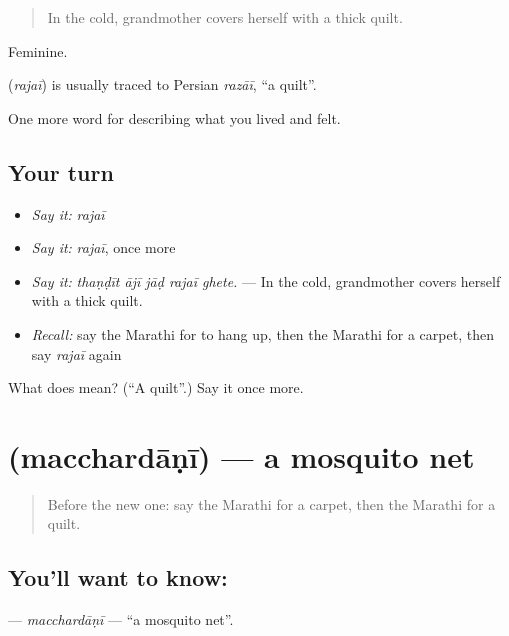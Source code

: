 \begin{quote}
In the cold, grandmother covers herself with a thick quilt.
\end{quote}

Feminine.

\begin{cousinweb}
\textbf{} (\emph{rajaī}) is usually traced to Persian \emph{razāī}, \textquotedblleft{}a quilt\textquotedblright{}.
\end{cousinweb}

\begin{grammarlens}[title={What you've built}]
One more word for describing what you lived and felt.
\end{grammarlens}

\subsection*{Your turn}
\begin{itemize}
\raggedright
  \item \emph{Say it:} \emph{rajaī}
  \item \emph{Say it:} \emph{rajaī}, once more
  \item \emph{Say it:} \emph{thaṇḍīt ājī jāḍ rajaī ghete.} — In the cold, grandmother covers herself with a thick quilt.
  \item \emph{Recall:} say the Marathi for to hang up, then the Marathi for a carpet, then say \emph{rajaī} again
\end{itemize}

\begin{tcolorbox}[breakable,colback=teal!4,colframe=teal!35!black,title={Before you move on}]
What does  mean? (\textquotedblleft{}A quilt\textquotedblright{}.) Say it once more.
\end{tcolorbox}
\section[\texorpdfstring{\mr{मच्छरदाणी} (macchardāṇī)}{मच्छरदाणी (macchardāṇī)}]{ (macchardāṇī) — a mosquito net}

\label{lesson:MR-C523-macchardani}



\begin{quote}
Before the new one: say the Marathi for a carpet, then the Marathi for a quilt.
\end{quote}

\subsection*{You'll want to know: }
\textbf{} — \emph{macchardāṇī} — \textquotedblleft{}a mosquito net\textquotedblright{}.

